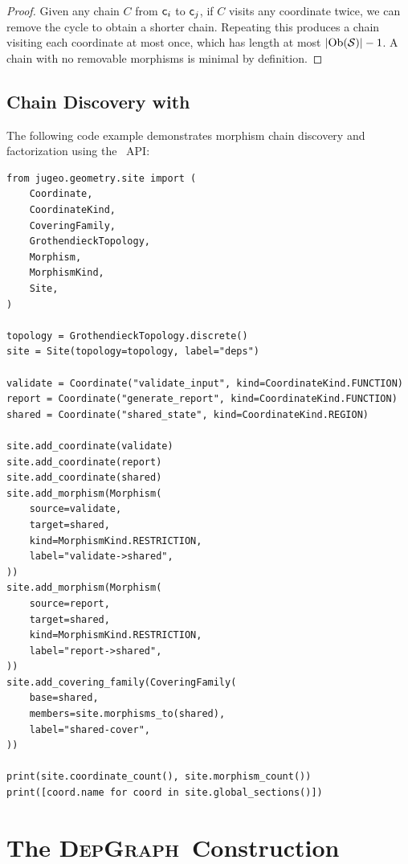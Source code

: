 \documentclass[11pt]{article}
\newcommand{\DepGraph}{\textsc{DepGraph}}
\begin{document}
\begin{proof}
Given any chain $C$ from $\mathsf{c}_i$ to $\mathsf{c}_j$, if $C$ visits any
coordinate twice, we can remove the cycle to obtain a shorter chain.
Repeating this produces a chain visiting each coordinate at most once,
which has length at most $|\mathrm{Ob}(\mathcal{S})| - 1$.  A chain with no
removable morphisms is minimal by definition.
\end{proof}

\subsection{Chain Discovery with \JuGeo}\label{sec:chain-api}

The following code example demonstrates morphism chain discovery and
factorization using the \JuGeo\ API:

\begin{lstlisting}[style=jugeo-python]
from jugeo.geometry.site import (
    Coordinate,
    CoordinateKind,
    CoveringFamily,
    GrothendieckTopology,
    Morphism,
    MorphismKind,
    Site,
)

topology = GrothendieckTopology.discrete()
site = Site(topology=topology, label="deps")

validate = Coordinate("validate_input", kind=CoordinateKind.FUNCTION)
report = Coordinate("generate_report", kind=CoordinateKind.FUNCTION)
shared = Coordinate("shared_state", kind=CoordinateKind.REGION)

site.add_coordinate(validate)
site.add_coordinate(report)
site.add_coordinate(shared)
site.add_morphism(Morphism(
    source=validate,
    target=shared,
    kind=MorphismKind.RESTRICTION,
    label="validate->shared",
))
site.add_morphism(Morphism(
    source=report,
    target=shared,
    kind=MorphismKind.RESTRICTION,
    label="report->shared",
))
site.add_covering_family(CoveringFamily(
    base=shared,
    members=site.morphisms_to(shared),
    label="shared-cover",
))

print(site.coordinate_count(), site.morphism_count())
print([coord.name for coord in site.global_sections()])
\end{lstlisting}

\section{The \DepGraph\ Construction}\label{sec:dep-graph}
\end{document}
